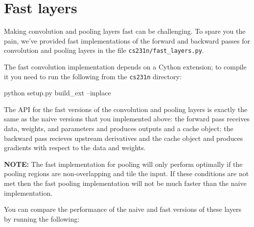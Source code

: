 \documentclass[11pt]{article}
\newenvironment{Shaded}{}{}
\newcommand{\NormalTok}[1]{{#1}}
\newcommand{\ExtensionTok}[1]{{#1}}
\begin{document}
    \section{Fast layers}\label{fast-layers}

Making convolution and pooling layers fast can be challenging. To spare
you the pain, we've provided fast implementations of the forward and
backward passes for convolution and pooling layers in the file
\texttt{cs231n/fast\_layers.py}.

The fast convolution implementation depends on a Cython extension; to
compile it you need to run the following from the \texttt{cs231n}
directory:

\begin{Shaded}
\begin{Highlighting}[]
\ExtensionTok{python}\NormalTok{ setup.py build_ext --inplace}
\end{Highlighting}
\end{Shaded}

The API for the fast versions of the convolution and pooling layers is
exactly the same as the naive versions that you implemented above: the
forward pass receives data, weights, and parameters and produces outputs
and a cache object; the backward pass recieves upstream derivatives and
the cache object and produces gradients with respect to the data and
weights.

\textbf{NOTE:} The fast implementation for pooling will only perform
optimally if the pooling regions are non-overlapping and tile the input.
If these conditions are not met then the fast pooling implementation
will not be much faster than the naive implementation.

You can compare the performance of the naive and fast versions of these
layers by running the following:
\end{document}
